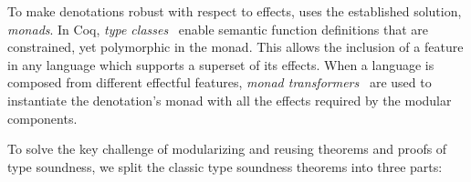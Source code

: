 To make denotations robust with respect to effects, \name uses the
established solution, \emph{monads}. In Coq, \emph{type
classes}~\cite{wadler89how-to} enable semantic function definitions
that are constrained, yet polymorphic in the monad. This allows the
inclusion of a feature in any language which supports a superset of
its effects. When a language is composed from different effectful
features, \emph{monad transformers}~\cite{liang95monad} are used to instantiate
the denotation's monad with all the effects required by the modular
components.

To solve the key challenge of modularizing and reusing theorems and proofs of 
type soundness, we split the classic type soundness theorems into three parts:
